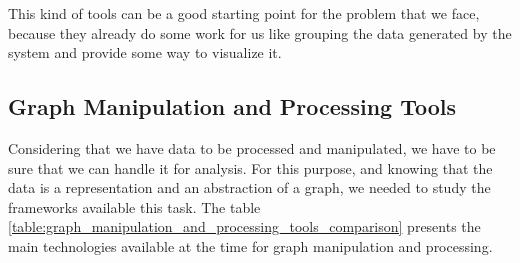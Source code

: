 This kind of tools can be a good starting point for the problem that we face, because they already do some work for us like grouping the data generated by the system and provide some way to visualize it. 

\subsection{Graph Manipulation and Processing Tools}
\label{subsec:graph_manipulation_and_processing_tools}

Considering that we have data to be processed and manipulated, we have to be sure that we can handle it for analysis. For this purpose, and knowing that the data is a representation and an abstraction of a graph, we needed to study the frameworks available this task. The table \ref{table:graph_manipulation_and_processing_tools_comparison} presents the main technologies available at the time for graph manipulation and processing.


